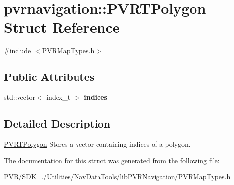 \hypertarget{structpvrnavigation_1_1_p_v_r_t_polygon}{\section{pvrnavigation\+:\+:P\+V\+R\+T\+Polygon Struct Reference}
\label{structpvrnavigation_1_1_p_v_r_t_polygon}
}


{\ttfamily \#include $<$P\+V\+R\+Map\+Types.\+h$>$}

\subsection*{Public Attributes}
\begin{DoxyCompactItemize}
\item 
\hypertarget{structpvrnavigation_1_1_p_v_r_t_polygon_ae61224a8f3d4a6c4bdb8c2d9551abc87}{std\+::vector$<$ index\+\_\+t $>$ {\bfseries indices}}\label{structpvrnavigation_1_1_p_v_r_t_polygon_ae61224a8f3d4a6c4bdb8c2d9551abc87}

\end{DoxyCompactItemize}


\subsection{Detailed Description}


  \hyperlink{structpvrnavigation_1_1_p_v_r_t_polygon}{P\+V\+R\+T\+Polygon}  Stores a vector containing indices of a polygon. 

The documentation for this struct was generated from the following file\+:\begin{DoxyCompactItemize}
\item 
P\+V\+R/\+S\+D\+K\+\_./\+Utilities/\+Nav\+Data\+Tools/lib\+P\+V\+R\+Navigation/P\+V\+R\+Map\+Types.\+h\end{DoxyCompactItemize}
